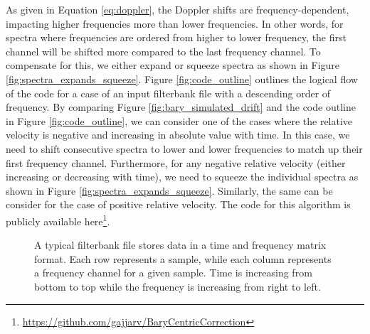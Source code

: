 As given in Equation \ref{eq:doppler}, the Doppler shifts are frequency-dependent, impacting higher frequencies more than lower frequencies. In other words, for spectra where frequencies are ordered from higher to lower frequency, the first channel will be shifted more compared to the last frequency channel. To compensate for this, we either expand or squeeze spectra as shown in Figure \ref{fig:spectra_expands_squeeze}. Figure \ref{fig:code_outline} outlines the logical flow of the code for a case of an input filterbank file with a descending order of frequency. By comparing Figure \ref{fig:bary_simulated_drift} and the code outline in Figure \ref{fig:code_outline}, we can consider one of the cases where the relative velocity is negative and increasing in absolute value with time. In this case, we need to shift consecutive spectra to lower and lower frequencies to match up their first frequency channel. Furthermore, for any negative relative velocity (either increasing or decreasing with time), we need to squeeze the individual spectra as shown in Figure \ref{fig:spectra_expands_squeeze}. Similarly, the same can be consider for the case of positive relative velocity. The code for this algorithm is publicly  available here\footnote{\url{https://github.com/gajjarv/BaryCentricCorrection}}.

\begin{figure}[h]
\centering
    \caption{A typical filterbank file stores data in a time and frequency matrix format. Each row represents a sample, while each column represents a frequency channel for a given sample. Time is increasing from bottom to top while the frequency is increasing from right to left.}
    \label{fig:example_filterbank_file}
\end{figure}

